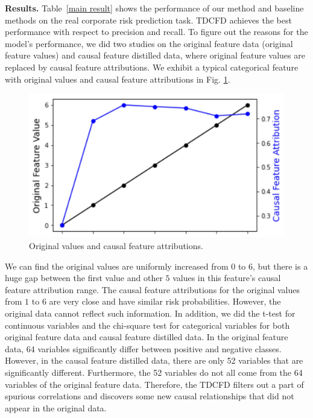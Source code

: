 \documentclass[letterpaper]{article} %
\theoremstyle{definition}
\theoremstyle{remark}
\begin{document}
\noindent\textbf{Results.} Table~\ref{main result} shows the performance of our method and baseline methods on the real corporate risk prediction task. TDCFD achieves the best performance with respect to precision and recall. To figure out the reasons for the model's performance, we did two studies on the original feature data (original feature values) and causal feature distilled data, where original feature values are replaced by causal feature attributions. We exhibit a typical categorical feature with original values and causal feature attributions in Fig. \ref{fig:compare}.
\begin{figure}
  \centering
  \includegraphics[width=0.7\linewidth]{compare.jpg}

  \caption{Original values and causal feature attributions.}

  \label{fig:compare}
\end{figure}
We can find the original values are uniformly increased from $0$ to $6$, but there is a huge gap between the first value and other $5$ values in this feature's causal feature attribution range. The causal feature attributions for the original values from $1$ to $6$ are very close and have similar risk probabilities. However, the original data cannot reflect such information. In addition, we did the t-test for continuous variables and the chi-square test for categorical variables for both original feature data and causal feature distilled data. In the original feature data, 64 variables significantly differ between positive and negative classes. However, in the causal feature distilled data, there are only 52 variables that are significantly different. Furthermore, the 52 variables do not all come from the 64 variables of the original feature data. Therefore, the TDCFD filters out a part of spurious correlations and discovers some new causal relationships that did not appear in the original data.
\end{document}
